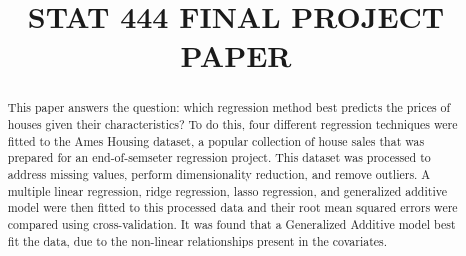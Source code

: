 \documentclass[aoas]{imsart}
\numberwithin{equation}{section}
\theoremstyle{plain}
\theoremstyle{remark}
\begin{document}
\begin{frontmatter}
\title{STAT 444 FINAL PROJECT PAPER}
\runtitle{}



\begin{aug}


\author[A]{ 
  }
  

\address[A]{Department of Statistics and Actuarial Science, University
of Waterloo,
  }
\end{aug}

\begin{abstract}
This paper answers the question: which regression method best predicts
the prices of houses given their characteristics? To do this, four
different regression techniques were fitted to the Ames Housing dataset,
a popular collection of house sales that was prepared for an
end-of-semseter regression project. This dataset was processed to
address missing values, perform dimensionality reduction, and remove
outliers. A multiple linear regression, ridge regression, lasso
regression, and generalized additive model were then fitted to this
processed data and their root mean squared errors were compared using
cross-validation. It was found that a Generalized Additive model best
fit the data, due to the non-linear relationships present in the
covariates.
\end{abstract}


\begin{keyword}
\end{keyword}

\end{frontmatter}
\end{document}

